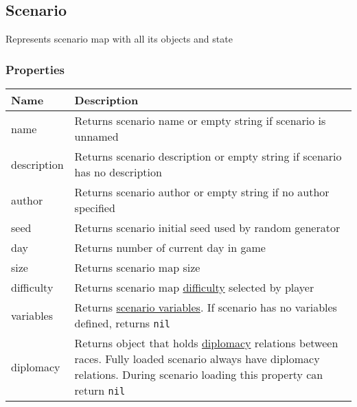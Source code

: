 \subsection{Scenario}
\label{Scenario}
Represents scenario map with all its objects and state
\subsubsection{Properties}
\begin{center}
\begin{tabularx}{\linewidth}{| l | X |}
\hline
\textbf{Name} & \textbf{Description} \\
\hline
name & Returns scenario name or empty string if scenario is unnamed\\
\hline
description & Returns scenario description or empty string if scenario has no description\\
\hline
author & Returns scenario author or empty string if no author specified\\
\hline
seed & Returns scenario initial seed used by random generator\\
\hline
day & Returns number of current day in game\\
\hline
size & Returns scenario map size\\
\hline
difficulty & Returns scenario map \hyperref[Difficulty]{difficulty} selected by player\\
\hline
variables & Returns \hyperref[ScenarioVariables]{scenario variables}. If scenario has no variables defined, returns \texttt{nil}\\
\hline
diplomacy & Returns object that holds \hyperref[Diplomacy]{diplomacy} relations between races. Fully loaded scenario always have diplomacy relations. During scenario loading this property can return \texttt{nil}\\
\hline
\end{tabularx}
\end{center}

